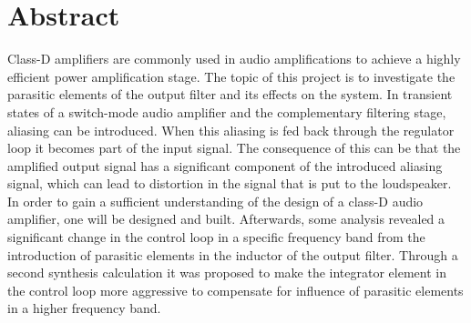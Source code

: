 \chapter*{Abstract}

Class-D amplifiers are commonly used in audio amplifications to achieve a highly efficient power amplification stage. The topic of this project is to investigate the parasitic elements of the output filter and its effects on the system. In transient states of a switch-mode audio amplifier and the complementary filtering stage, aliasing can be introduced. When this aliasing is fed back through the regulator loop it becomes part of the input signal. The consequence of this can be that the amplified output signal has a significant component of the introduced aliasing signal, which can lead to distortion in the signal that is put to the loudspeaker. In order to gain a sufficient understanding of the design of a class-D audio amplifier, one will be designed and built. Afterwards, some analysis revealed a significant change in the control loop in a specific frequency band from the introduction of parasitic elements in the inductor of the output filter. Through a second synthesis calculation it was proposed to make the integrator element in the control loop more aggressive to compensate for influence of parasitic elements in a higher frequency band.



